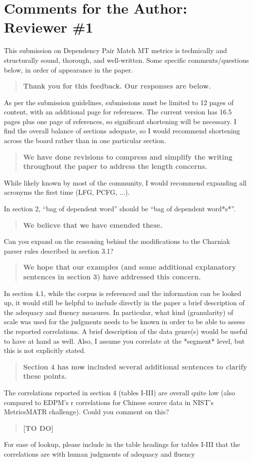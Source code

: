 \documentclass[letterpaper,12pt]{article}
\newenvironment{response}
{\begin{quotation} \bf}
  {\end{quotation}}
\begin{document}
\section{Comments for the Author: Reviewer \#1}
\label{sec:reviewer1}

This submission on Dependency Pair Match MT metrics is technically and
structurally sound, thorough, and well-written.  Some specific
comments/questions below, in order of appearance in the paper.
\begin{response}
  Thank you for this feedback. Our responses are below.
\end{response}
As per the submission guidelines, submissions must be limited to 12
pages of content, with an additional page for references.  The current
version has 16.5 pages plus one page of references, so significant
shortening will be necessary.  I find the overall balance of sections
adequate, so I would recommend shortening across the board rather than
in one particular section.
\begin{response}
  We have done revisions to compress and simplify the writing
  throughout the paper to address the length concerns.
\end{response}
While likely known by most of the community, I would recommend
expanding all acronyms the first time (LFG, PCFG, ...).

In section 2, ``bag of dependent word'' should be ``bag of dependent
word*s*''.
\begin{response}
  We believe that we have emended these.
\end{response}
Can you expand on the reasoning behind the modifications to the
Charniak parser rules described in section 3.1?
\begin{response}
  We hope that our examples (and some additional explanatory sentences
  in section 3) have addressed this concern.
\end{response}
In section 4.1, while the corpus is referenced and the information can
be looked up, it would still be helpful to include directly in the
paper a brief description of the adequacy and fluency measures.  In
particular, what kind (granularity) of scale was used for the
judgments needs to be known in order to be able to assess the reported
correlations.  A brief description of the data genre(s) would be
useful to have at hand as well.  Also, I assume you correlate at the
*segment* level, but this is not explicitly stated.
\begin{response}
  Section 4 has now included several additional sentences to clarify
  these points.
\end{response}
The correlations reported in section 4 (tables I-III) are overall
quite low (also compared to EDPM's r correlations for Chinese source
data in NIST's MetricsMATR challenge).  Could you comment on this?
\begin{response} [TO DO]
\end{response}
For ease of lookup, please include in the table headings for tables
I-III that the correlations are with human judgments of adequacy and
fluency
\end{document}
